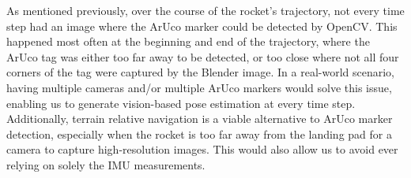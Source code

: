 \documentclass[conference]{IEEEtran}
\begin{document}
As mentioned previously, over the course of the rocket's trajectory, not every time step had an image where the ArUco marker could be detected by OpenCV.
This happened most often at the beginning and end of the trajectory, where the ArUco tag was either too far away to be detected, or too close where not all four corners of the tag were captured by the Blender image. 
In a real-world scenario, having multiple cameras and/or multiple ArUco markers would solve this issue, enabling us to generate vision-based pose estimation at every time step.
Additionally, terrain relative navigation is a viable alternative to ArUco marker detection, especially when the rocket is too far away from the landing pad for a camera to capture high-resolution images. 
This would also allow us to avoid ever relying on solely the IMU measurements. 







\end{document}
